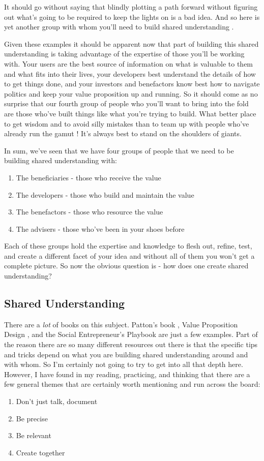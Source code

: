 \documentclass[11pt,a5paper]{book}
\begin{document}
It should go without saying that blindly plotting a path forward without figuring out what's going to be required to keep the lights on is a bad idea. And so here is yet another group with whom you'll need to build shared understanding \cite{macmillan}. 
\newline

Given these examples it should be apparent now that part of building this shared understanding is taking advantage of the expertise of those you'll be working with. Your users are the best source of information on what is valuable to them and what fits into their lives, your developers best understand the details of how to get things done, and your investors and benefactors know best how to navigate politics and keep your value proposition up and running. So it should come as no surprise that our fourth group of people who you'll want to bring into the fold are those who've built things like what you're trying to build. What better place to get wisdom and to avoid silly mistakes than to team up with people who've already run the gamut \cite{macmillan}! It's always best to stand on the shoulders of giants. 
\newline

In sum, we've seen that we have four groups of people that we need to be building shared understanding with:
\begin{enumerate}
\item The beneficiaries - those who receive the value
\item The developers - those who build and maintain the value
\item The benefactors - those who resource the value
\item The advisers - those who've been in your shoes before
\end{enumerate}  
Each of these groups hold the expertise and knowledge to flesh out, refine, test, and create a different facet of your idea and without all of them you won't get a complete picture. So now the obvious question is - how does one create shared understanding?

\subsection{Shared Understanding}
There are a \textit{lot} of books on this subject. Patton's book \cite{patton}, Value Proposition Design \cite{valueprop}, and the Social Entrepreneur's Playbook \cite{macmillan} are just a few examples. Part of the reason there are so many different resources out there is that the specific tips and tricks depend on what you are building shared understanding around and with whom. So I'm certainly not going to try to get into all that depth here. However, I have found in my reading, practicing, and thinking that there are a few general themes that are certainly worth mentioning and run across the board:
\begin{enumerate}
\item Don't just talk, document
\item Be precise
\item Be relevant
\item Create together
\end{enumerate}
\end{document}

